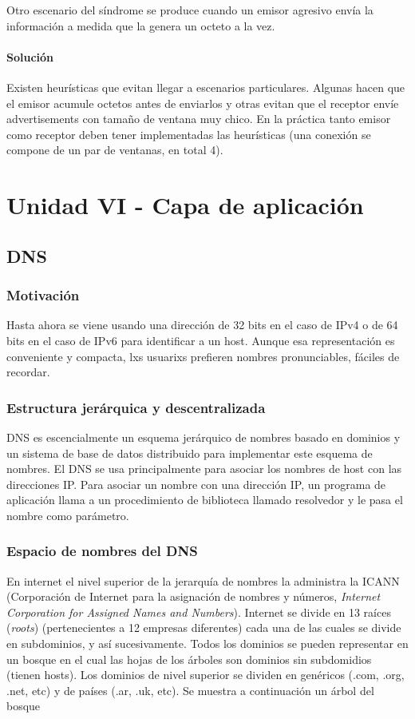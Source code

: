 \documentclass{book}
\begin{document}
	Otro escenario del síndrome se produce cuando un emisor agresivo envía la información a medida que la genera un octeto a la vez.
	
	\subsubsection{Solución}
	Existen heurísticas que evitan llegar a escenarios particulares. Algunas hacen que el emisor acumule octetos antes de enviarlos y otras evitan que el receptor envíe advertisements con tamaño de ventana muy chico. En la práctica tanto emisor como receptor deben tener implementadas las heurísticas (una conexión se compone de un par de ventanas, en total 4).
	
	\chapter{Unidad VI - Capa de aplicación}
	
	\section{DNS}
	\subsection{Motivación}
	Hasta ahora se viene usando una dirección de 32 bits en el caso de IPv4 o de 64 bits en el caso de IPv6 para identificar a un host. Aunque esa representación es conveniente y compacta, lxs usuarixs prefieren nombres pronunciables, fáciles de recordar.
	
	\subsection{Estructura jerárquica y descentralizada}
	DNS es escencialmente un esquema jerárquico de nombres basado en dominios y un sistema de base de datos distribuido para implementar este esquema de nombres. El DNS se usa principalmente para asociar los nombres de host con las direcciones IP. Para asociar un nombre con una dirección IP, un programa de aplicación llama a un procedimiento de biblioteca llamado resolvedor y le pasa el nombre como parámetro.
	
	\subsection{Espacio de nombres del DNS}
	En internet el nivel superior de la jerarquía de nombres la administra la ICANN (Corporación de Internet para la asignación de nombres y números, \textit{Internet Corporation for Assigned Names and Numbers}). Internet se divide en 13 raíces (\textit{roots}) (pertenecientes a 12 empresas diferentes) cada una de las cuales se divide en subdominios, y así sucesivamente. Todos los dominios se pueden representar en un bosque en el cual las hojas de los árboles son dominios sin subdomidios (tienen hosts). Los dominios de nivel superior se dividen en genéricos (.com, .org, .net, etc) y de países (.ar, .uk, etc). Se muestra a continuación un árbol del bosque
	
\end{document}
